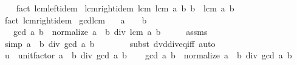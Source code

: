 \begin{isabellebody}
%
\isadelimproof
\ \ %
\endisadelimproof
%
\isatagproof
{}\isamarkupfalse%
\ {\isacharparenleft}{\kern0pt}fact\ lcm{\isachardot}{\kern0pt}left{\isacharunderscore}{\kern0pt}idem{\isacharparenright}{\kern0pt}%
\endisatagproof
{\isafoldproof}%
%
\isadelimproof
\isanewline
%
\endisadelimproof
\isanewline
{}\isamarkupfalse%
\ lcm{\isacharunderscore}{\kern0pt}right{\isacharunderscore}{\kern0pt}idem{\isacharcolon}{\kern0pt}\ {\isachardoublequoteopen}lcm\ {\isacharparenleft}{\kern0pt}lcm\ a\ b{\isacharparenright}{\kern0pt}\ b\ {\isacharequal}{\kern0pt}\ lcm\ a\ b{\isachardoublequoteclose}\isanewline
%
\isadelimproof
\ \ %
\endisadelimproof
%
\isatagproof
{}\isamarkupfalse%
\ {\isacharparenleft}{\kern0pt}fact\ lcm{\isachardot}{\kern0pt}right{\isacharunderscore}{\kern0pt}idem{\isacharparenright}{\kern0pt}%
\endisatagproof
{\isafoldproof}%
%
\isadelimproof
\isanewline
%
\endisadelimproof
\isanewline
{}\isamarkupfalse%
\ gcd{\isacharunderscore}{\kern0pt}lcm{\isacharcolon}{\kern0pt}\isanewline
\ \ \ {\isachardoublequoteopen}a\ {\isasymnoteq}\ {}{\isachardoublequoteclose}\ \ {\isachardoublequoteopen}b\ {\isasymnoteq}\ {}{\isachardoublequoteclose}\isanewline
\ \ \ {\isachardoublequoteopen}gcd\ a\ b\ {\isacharequal}{\kern0pt}\ normalize\ {\isacharparenleft}{\kern0pt}a\ {\isacharasterisk}{\kern0pt}\ b\ div\ lcm\ a\ b{\isacharparenright}{\kern0pt}{\isachardoublequoteclose}\isanewline
%
\isadelimproof
%
\endisadelimproof
%
\isatagproof
{}\isamarkupfalse%
\ {\isacharminus}{\kern0pt}\isanewline
\ \ \isamarkupfalse%
\ assms\ \isamarkupfalse%
\ {\isacharbrackleft}{\kern0pt}simp{\isacharbrackright}{\kern0pt}{\isacharcolon}{\kern0pt}\ {\isachardoublequoteopen}a\ {\isacharasterisk}{\kern0pt}\ b\ div\ gcd\ a\ b\ {\isasymnoteq}\ {}{\isachardoublequoteclose}\isanewline
\ \ \ \ \isamarkupfalse%
\ {\isacharparenleft}{\kern0pt}subst\ dvd{\isacharunderscore}{\kern0pt}div{\isacharunderscore}{\kern0pt}eq{\isacharunderscore}{\kern0pt}{}{\isacharunderscore}{\kern0pt}iff{\isacharparenright}{\kern0pt}\ auto\isanewline
\ \ \isamarkupfalse%
\ {\isacharquery}{\kern0pt}u\ {\isacharequal}{\kern0pt}\ {\isachardoublequoteopen}unit{\isacharunderscore}{\kern0pt}factor\ {\isacharparenleft}{\kern0pt}a\ {\isacharasterisk}{\kern0pt}\ b\ div\ gcd\ a\ b{\isacharparenright}{\kern0pt}{\isachardoublequoteclose}\isanewline
\ \ \isamarkupfalse%
\ {\isachardoublequoteopen}gcd\ a\ b\ {\isacharasterisk}{\kern0pt}\ normalize\ {\isacharparenleft}{\kern0pt}a\ {\isacharasterisk}{\kern0pt}\ b\ div\ gcd\ a\ b{\isacharparenright}{\kern0pt}\ {\isacharequal}{\kern0pt}\isanewline

\end{isabellebody}
